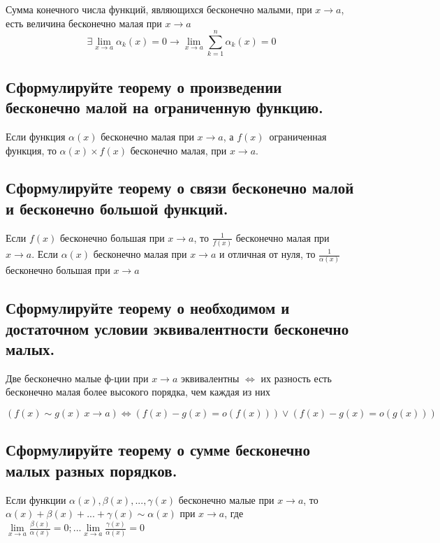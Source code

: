     Сумма конечного числа функций, являющихся бесконечно малыми, при $x \to a$, 
    есть величина бесконечно малая при $x \to a$
    $$\exists \lim\limits_{x \to a} \alpha _k (x) = 0 \rightarrow \lim\limits_{x \to a} 
    \sum\limits_{k=1}^n \alpha _k (x) = 0$$


    \subsection{Сформулируйте теорему о произведении бесконечно малой на ограниченную функцию. }
    
    Если функция $\alpha  (x)$ бесконечно малая при $x \to a$, а $f(x)$ ограниченная функция, то
    $\alpha  (x) \times f(x)$ бесконечно малая, при $x \to a$.

    \subsection{Сформулируйте теорему о связи бесконечно малой и бесконечно большой функций. }

    Если $f(x)$ бесконечно большая при $x \to a$, то $\frac{1}{f(x)}$ бесконечно малая при $x \to a$.
    Если $\alpha  (x)$ бесконечно малая при $x \to a$ и отличная от нуля, то $\frac{1}{\alpha (x)}$ 
    бесконечно большая при $x \to a$

    \subsection{Сформулируйте теорему о необходимом и достаточном условии эквивалентности бесконечно малых. }

    Две бесконечно малые ф-ции при $x \to a$ эквивалентны $\iff$ их разность есть бесконечно
    малая более высокого порядка, чем каждая из них

    $$(f(x) \sim g(x) \ x \to a) \iff (f(x) - g(x) = o(f(x))) \vee (f(x) - g(x) = o(g(x)))$$


    \subsection{Сформулируйте теорему о сумме бесконечно малых разных порядков. }
    
    Если функции $\alpha  (x), \beta (x), ..., \gamma (x)$ бесконечно малые при $x \to a$,
    то $\alpha  (x) + \beta (x) + ... + \gamma (x) \sim \alpha  (x)$ при $x \to a$,
    где $\lim\limits_{x \to a} \frac{\beta (x)}{\alpha (x)} = 0; ...
    \lim\limits_{x \to a} \frac{\gamma (x)}{\alpha (x)} = 0$
    

